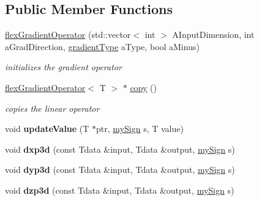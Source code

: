 \subsection*{Public Member Functions}
\begin{DoxyCompactItemize}
\item 
\hyperlink{classflex_gradient_operator_aa83ae15b09ba2195951d8df803f08705}{flex\+Gradient\+Operator} (std\+::vector$<$ int $>$ A\+Input\+Dimension, int a\+Grad\+Direction, \hyperlink{tools_8h_a40b3c158323c8bcb80e2095f3473213c}{gradient\+Type} a\+Type, bool a\+Minus)
\begin{DoxyCompactList}\small\item\em initializes the gradient operator \end{DoxyCompactList}\item 
\hyperlink{classflex_gradient_operator}{flex\+Gradient\+Operator}$<$ T $>$ $\ast$ \hyperlink{classflex_gradient_operator_a4b1480051ac7763da809c509685316d2}{copy} ()
\begin{DoxyCompactList}\small\item\em copies the linear operator \end{DoxyCompactList}\item 
\mbox{\label{classflex_gradient_operator_a1e71bbd56e480f5444ff6e32b0002040}} 
void {\bfseries update\+Value} (T $\ast$ptr, \hyperlink{tools_8h_ab8be8fa992a31c15058261e81ef8ba9d}{my\+Sign} s, T value)
\item 
\mbox{\label{classflex_gradient_operator_ad468dc07bc6e302bf8931d45ba8efaa6}} 
void {\bfseries dxp3d} (const Tdata \&input, Tdata \&output, \hyperlink{tools_8h_ab8be8fa992a31c15058261e81ef8ba9d}{my\+Sign} s)
\item 
\mbox{\label{classflex_gradient_operator_a7435c2408c7be34206a4662da37fe058}} 
void {\bfseries dyp3d} (const Tdata \&input, Tdata \&output, \hyperlink{tools_8h_ab8be8fa992a31c15058261e81ef8ba9d}{my\+Sign} s)
\item 
\mbox{\label{classflex_gradient_operator_a5eefd707f1f71f20c2abbe7160d660b3}} 
void {\bfseries dzp3d} (const Tdata \&input, Tdata \&output, \hyperlink{tools_8h_ab8be8fa992a31c15058261e81ef8ba9d}{my\+Sign} s)
\item 
\mbox{\label{classflex_gradient_operator_a6de07d9888e203f7eaa0f630f3d57c18}} 

\end{DoxyCompactItemize}
